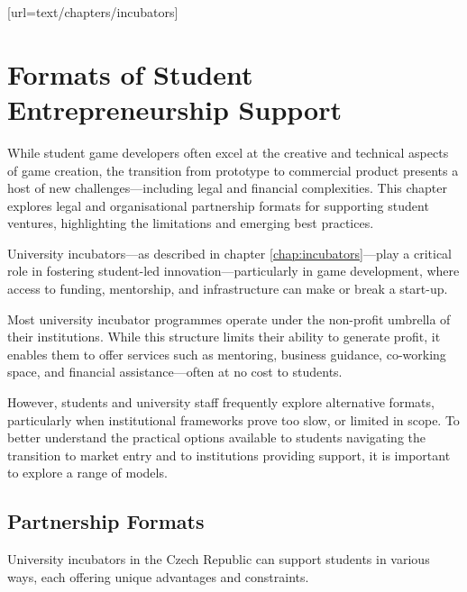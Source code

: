 [url=text/chapters/incubators]
\chapter{Formats of Student Entrepreneurship Support}\label{chap:support-formats}

\begin{chapterabstract}
    While student game developers often excel at the creative and technical aspects of game creation, the transition from prototype to commercial product presents a host of new challenges---including legal and financial complexities. This chapter explores legal and organisational partnership formats for supporting student ventures, highlighting the limitations and emerging best practices.
\end{chapterabstract}

University incubators—as described in chapter \ref{chap:incubators}---play a critical role in fostering student-led innovation---particularly in game development, where access to funding, mentorship, and infrastructure can make or break a start-up.

Most university incubator programmes operate under the non-profit umbrella of their institutions. While this structure limits their ability to generate profit, it enables them to offer services such as mentoring, business guidance, co-working space, and financial assistance---often at no cost to students.

However, students and university staff frequently explore alternative formats, particularly when institutional frameworks prove too slow, or limited in scope. To better understand the practical options available to students navigating the transition to market entry and to institutions providing support, it is important to explore a range of models.

\section{Partnership Formats}\label{sec:partnership-formats}
University incubators in the Czech Republic can support students in various ways, each offering unique advantages and constraints.

